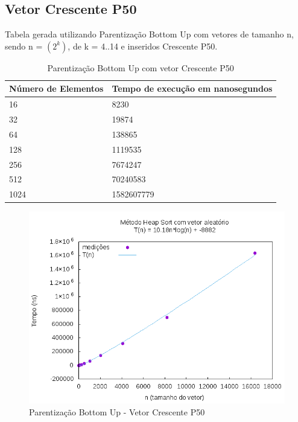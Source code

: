 \documentclass[12pt,a4paper,twoside]{report}
\begin{document}
\subsection{Vetor Crescente P50}
Tabela gerada utilizando Parentização Bottom Up com vetores de tamanho n, sendo n = $(2^k)$, de k = 4..14 e inseridos Crescente P50.
\begin{table}[H]
\centering
\caption{Parentização Bottom Up com vetor Crescente P50}
\label{my-label}
\begin{tabular}{|l|l|}
\hline
\multicolumn{1}{|c|}{\textbf{Número de Elementos}} & \multicolumn{1}{c|}{\textbf{Tempo de execução em nanosegundos}} \\ \hline
16 & 8230 \\ \hline
32 & 19874 \\ \hline
64 & 138865 \\ \hline
128 & 1119535 \\ \hline
256 & 7674247 \\ \hline
512 & 70240583 \\ \hline
1024 & 1582607779 \\ \hline
\end{tabular}
\end{table}

\begin{figure}[H]
    \centering
    \includegraphics[width=0.7\linewidth]{graficos/HeapSort/vIntAleatorio/vIntAleatorio.png}
  \caption{Parentização Bottom Up - Vetor Crescente P50}
\end{figure}
\end{document}
